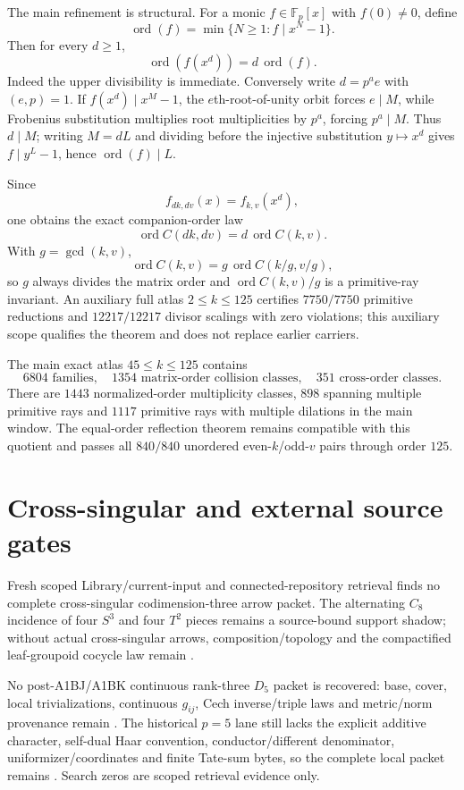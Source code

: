 \documentclass[9.5pt,a4paper]{article}
\begin{document}
The main refinement is structural.  For a monic $f\in\mathbb F_p[x]$ with $f(0)\ne0$, define
\[
\operatorname{ord}(f)=\min\{N\ge1:f\mid x^N-1\}.
\]
Then for every $d\ge1$,
\[
\boxed{\operatorname{ord}(f(x^d))=d\,\operatorname{ord}(f).}
\]
Indeed the upper divisibility is immediate.  Conversely write $d=p^ae$ with $(e,p)=1$.  If $f(x^d)\mid x^M-1$, the $e$th-root-of-unity orbit forces $e\mid M$, while Frobenius substitution multiplies root multiplicities by $p^a$, forcing $p^a\mid M$.  Thus $d\mid M$; writing $M=dL$ and dividing before the injective substitution $y\mapsto x^d$ gives $f\mid y^L-1$, hence $\operatorname{ord}(f)\mid L$.

Since
\[
f_{dk,dv}(x)=f_{k,v}(x^d),
\]
one obtains the exact companion-order law
\[
\boxed{\operatorname{ord}C(dk,dv)=d\,\operatorname{ord}C(k,v).}
\]
With $g=\gcd(k,v)$,
\[
\boxed{\operatorname{ord}C(k,v)=g\,\operatorname{ord}C(k/g,v/g),}
\]
so $g$ always divides the matrix order and $\operatorname{ord}C(k,v)/g$ is a primitive-ray invariant.  An auxiliary full atlas $2\le k\le125$ certifies $7750/7750$ primitive reductions and $12217/12217$ divisor scalings with zero violations; this auxiliary scope qualifies the theorem and does not replace earlier carriers.

The main exact atlas $45\le k\le125$ contains
\[
\boxed{6804\text{ families},\quad1354\text{ matrix-order collision classes},\quad351\text{ cross-order classes}.}
\]
There are $1443$ normalized-order multiplicity classes, $898$ spanning multiple primitive rays and $1117$ primitive rays with multiple dilations in the main window.  The equal-order reflection theorem remains compatible with this quotient and passes all $840/840$ unordered even-$k$/odd-$v$ pairs through order $125$.

\section{Cross-singular and external source gates}
Fresh scoped Library/current-input and connected-repository retrieval finds no complete cross-singular codimension-three arrow packet.  The alternating $C_8$ incidence of four $S^3$ and four $T^2$ pieces remains a source-bound support shadow; without actual cross-singular arrows, composition/topology and the compactified leaf-groupoid cocycle law remain \SEP.

No post-A1BJ/A1BK continuous rank-three $D_5$ packet is recovered: base, cover, local trivializations, continuous $g_{ij}$, Cech inverse/triple laws and metric/norm provenance remain \NT.  The historical $p=5$ lane still lacks the explicit additive character, self-dual Haar convention, conductor/different denominator, uniformizer/coordinates and finite Tate-sum bytes, so the complete local packet remains \SEP.  Search zeros are scoped retrieval evidence only.
\end{document}

